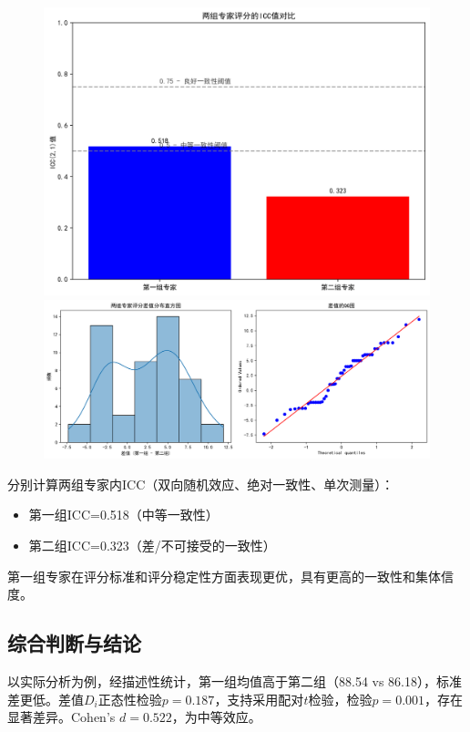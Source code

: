 \begin{figure}[H]
    \centering
    \begin{minipage}[t]{0.5\textwidth}
        \centering
        \includegraphics[width=1\textwidth]{icc_analysis.png}
    \end{minipage}
    \hfill
    \begin{minipage}[t]{1\textwidth}
        \centering
        \includegraphics[width=1\textwidth]{normality_test.png}
    \end{minipage}
\end{figure}


分别计算两组专家内ICC（双向随机效应、绝对一致性、单次测量）：
\begin{itemize}
    \item 第一组ICC=0.518（中等一致性）
    \item 第二组ICC=0.323（差/不可接受的一致性）
\end{itemize}
第一组专家在评分标准和评分稳定性方面表现更优，具有更高的一致性和集体信度。

\subsection{综合判断与结论}
以实际分析为例，经描述性统计，第一组均值高于第二组（88.54 vs 86.18），标准差更低。差值$D_i$正态性检验$p=0.187$，支持采用配对$t$检验，检验$p=0.001$，存在显著差异。Cohen's $d=0.522$，为中等效应。

